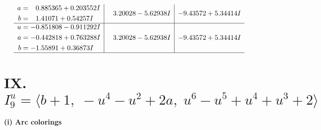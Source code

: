 \documentclass[1p]{elsarticle_modified}
\theoremstyle{definition}
\begin{document}
$$\begin{array}{c|c|c}
\begin{aligned}
a &= \phantom{-}0.885365 + 0.203552 I \\
b &= \phantom{-}1.41071 + 0.54257 I\end{aligned}
 & \phantom{-}3.20028 - 5.62938 I & -9.43572 + 5.34414 I \\ \hline\begin{aligned}
u &= -0.851808 - 0.911292 I \\
a &= -0.442818 + 0.763288 I \\
b &= -1.55891 + 0.36873 I\end{aligned}
 & \phantom{-}3.20028 - 5.62938 I & -9.43572 + 5.34414 I\\
 \hline 
 \end{array}$$\newpage\newpage\renewcommand{\arraystretch}{1}
\centering \section*{IX. $I^u_{9}= \langle b+1,\;- u^4- u^2+2 a,\;u^6- u^5+u^4+u^3+2 \rangle$}
\flushleft \textbf{(i) Arc colorings}\\
\end{document}
